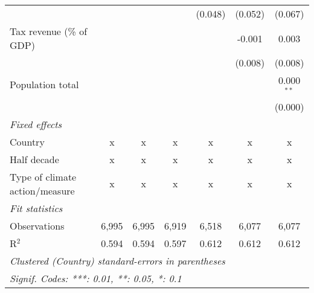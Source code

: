 \begin{tabular}{lcccccc}
                                                              &         &              &               & (0.048)     & (0.052)      & (0.067)\\   
   Tax revenue (\% of GDP)                                    &         &              &               &             & -0.001       & 0.003\\   
                                                              &         &              &               &             & (0.008)      & (0.008)\\   
   Population total                                           &         &              &               &             &              & 0.000$^{**}$\\   
                                                              &         &              &               &             &              & (0.000)\\   
   \emph{Fixed effects}\\
   Country                                                    & x       & x            & x             & x           & x            & x\\  
   Half decade                                                & x       & x            & x             & x           & x            & x\\  
   Type of climate action/measure                             & x       & x            & x             & x           & x            & x\\  
   \midrule \emph{Fit statistics}\\
   Observations                                               & 6,995   & 6,995        & 6,919         & 6,518       & 6,077        & 6,077\\  
   R$^2$                                                      & 0.594   & 0.594        & 0.597         & 0.612       & 0.612        & 0.612\\  
   \midrule
   \multicolumn{7}{l}{\emph{Clustered (Country) standard-errors in parentheses}}\\
   \multicolumn{7}{l}{\emph{Signif. Codes: ***: 0.01, **: 0.05, *: 0.1}}\\
\end{tabular}
\par\endgroup


